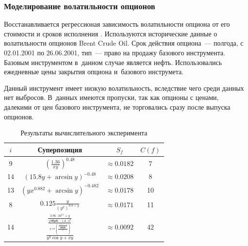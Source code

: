 \documentclass[12pt,a4paper]{article}
\begin{document}
\subsubsection{Моделирование волатильности опционов}

Восстанавливается регрессионая зависимость
волатильности опциона от его стоимости и сроков исполнения
\cite{daglish07theory,strijov09jct}. Используются исторические данные о
волатильности опционов Brent Crude Oil. Срок действия опциона~--- полгода,
с 02.01.2001 по 26.06.2001, тип~--- право на продажу базового инструмента.
Базовым инструментом в~данном случае является нефть. Использовались
ежедневные цены закрытия опциона и~базового инструмета.

Данный инструмент имеет низкую волатильность, вследствие чего среди данных
нет выбросов. В~данных имеются пропуски, так как опционы с ценами, далекими
от цен базового инструмента, не торговались сразу после выпуска опционов.

\begin{table}[h]
  \centering
  \begin{tabular}{| c | c | c | c |} \hline
	$i$ & Суперпозиция													& $S_f$				& $C(f)$ \\ \hline
	9	& $\displaystyle \left(\frac{1.36}{xy}\right)^{0.48}$			& $\approx 0.0182$	& 7		\\ \hline
	14	& $\displaystyle (15.8y + \arcsin y)^{-0.48}$					& $\approx 0.0208$	& 8		\\ \hline
	13	& $\displaystyle (yx^{0.882} + \arcsin y)^{-0.482}$				& $\approx 0.0178$	& 10	\\ \hline
	8	& $\displaystyle 0.125 \frac{y}{(y^2)^{0.8+y}}$					& $\approx 0.0171$	& 11	\\ \hline
	14	& $\displaystyle \frac{\frac{3.86 \cdot 10^{11} + y}{\frac{y\frac{1.227 \cdot 10^{11}}{x^y}-2.46 \cdot 10^{8}}{y \cos \left(\frac{\frac{-5.89 \cdot 10^{-3}+y}{\frac{y - 5.47 \cdot 10^{-3}}{y \cos y}}}{y}\right)}}}{y^y \cos y + xy}$	& $\approx 0.0092$	& 42		\\ \hline
  \end{tabular}
  \caption{Результаты вычислительного эксперимента}
  \label{tabl:results}
\end{table}
\end{document}
